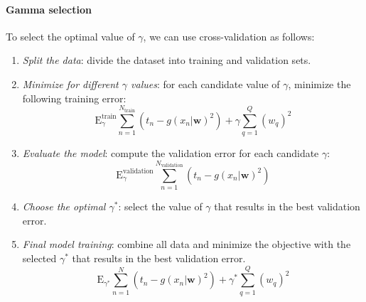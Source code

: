 \paragraph*{Gamma selection}
To select the optimal value of $\gamma$, we can use cross-validation as follows:
\begin{enumerate}
    \item \textit{Split the data}: divide the dataset into training and validation sets.
    \item \textit{Minimize for different $\gamma$ values}: for each candidate value of $\gamma$, minimize the following training error:
        \[\text{E}_{\gamma}^{\text{train}}\sum_{n=1}^{N_{\text{train}}}(t_n-g(x_n|\mathbf{w})^2)+\gamma\sum_{q=1}^Q(w_q)^2\]
    \item \textit{Evaluate the model}: compute the validation error for each candidate $\gamma$:
        \[\text{E}_{\gamma}^{\text{validation}}\sum_{n=1}^{N_{\text{validation}}}(t_n-g(x_n|\mathbf{w})^2)\]
    \item \textit{Choose the optimal $\gamma^\ast$}: select the value of $\gamma$ that results in the best validation error.
    \item \textit{Final model training}: combine all data and minimize the objective with the selected $\gamma^\ast$ that results in the best validation error.
        \[\text{E}_{\gamma^\ast}\sum_{n=1}^{N}(t_n-g(x_n|\mathbf{w})^2)+\gamma^\ast\sum_{q=1}^Q(w_q)^2\]
\end{enumerate}

